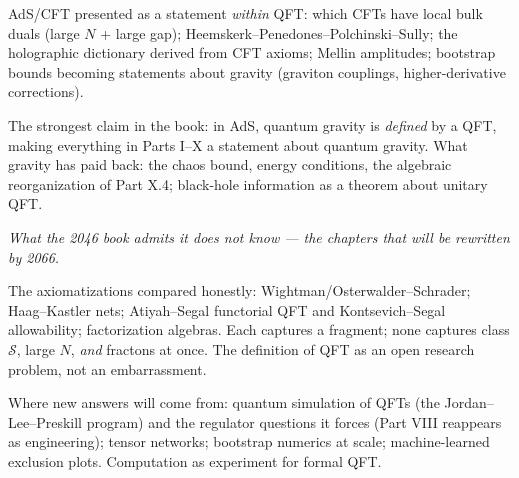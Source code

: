 AdS/CFT presented as a statement \emph{within} QFT: which CFTs have local bulk duals (large $N$ + large gap); Heemskerk--Penedones--Polchinski--Sully; the holographic dictionary derived from CFT axioms; Mellin amplitudes; bootstrap bounds becoming statements about gravity (graviton couplings, higher-derivative corrections).

The strongest claim in the book: in AdS, quantum gravity is \emph{defined} by a QFT, making everything in Parts I--X a statement about quantum gravity. What gravity has paid back: the chaos bound, energy conditions, the algebraic reorganization of Part X.4; black-hole information as a theorem about unitary QFT.


\noin \emph{What the 2046 book admits it does not know --- the chapters that will be rewritten by 2066.}

The axiomatizations compared honestly: Wightman/Osterwalder--Schrader; Haag--Kastler nets; Atiyah--Segal functorial QFT and Kontsevich--Segal allowability; factorization algebras. Each captures a fragment; none captures class $\mathcal{S}$, large $N$, \emph{and} fractons at once. The definition of QFT as an open research problem, not an embarrassment.

Where new answers will come from: quantum simulation of QFTs (the Jordan--Lee--Preskill program) and the regulator questions it forces (Part VIII reappears as engineering); tensor networks; bootstrap numerics at scale; machine-learned exclusion plots. Computation as experiment for formal QFT.

